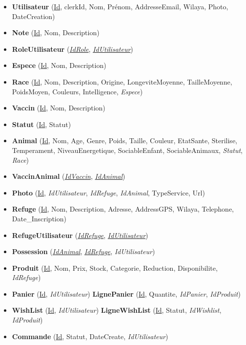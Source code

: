 \documentclass[12pt,a4paper]{report}
\begin{document}
{\small
\begin{itemize}[leftmargin=1.5em,itemsep=2pt]
  \item \textbf{Utilisateur} (\underline{Id}, clerkId, Nom, Prénom, AddresseEmail, Wilaya, Photo, DateCreation)
  \item \textbf{Note} (\underline{Id}, Nom, Description)
  \item \textbf{RoleUtilisateur} (\underline{\textit{IdRole}}, \underline{\textit{IdUtilisateur}})
  \item \textbf{Espece} (\underline{Id}, Nom, Description)
  \item \textbf{Race} (\underline{Id}, Nom, Description, Origine, LongeviteMoyenne, TailleMoyenne, PoidsMoyen, Couleurs, Intelligence, \textit{Espece})
  \item \textbf{Vaccin} (\underline{Id}, Nom, Description)
  \item \textbf{Statut} (\underline{Id}, Statut)
  \item \textbf{Animal} (\underline{Id}, Nom, Age, Genre, Poids, Taille, Couleur, EtatSante, Sterilise, Temperament, NiveauEnergetique, SociableEnfant, SociableAnimaux, \textit{Statut}, \textit{Race})
  \item \textbf{VaccinAnimal} (\underline{\textit{IdVaccin}}, \underline{\textit{IdAnimal}})
  \item \textbf{Photo} (\underline{Id}, \textit{IdUtilisateur}, \textit{IdRefuge}, \textit{IdAnimal}, TypeService, Url)
  \item \textbf{Refuge} (\underline{Id}, Nom, Description, Adresse, AddressGPS, Wilaya, Telephone, Date\_Inscription)
  \item \textbf{RefugeUtilisateur} (\underline{\textit{IdRefuge}}, \underline{\textit{IdUtilisateur}})
  \item \textbf{Possession} (\underline{\textit{IdAnimal}}, \underline{\textit{IdRefuge}}, \textit{IdUtilisateur})
  \item \textbf{Produit} (\underline{Id}, Nom, Prix, Stock, Categorie, Reduction, Disponibilite, \textit{IdRefuge})
  \item \textbf{Panier} (\underline{Id}, \textit{IdUtilisateur}) \quad \textbf{LignePanier} (\underline{Id}, Quantite, \textit{IdPanier}, \textit{IdProduit})
  \item \textbf{WishList} (\underline{Id}, \textit{IdUtilisateur}) \quad \textbf{LigneWishList} (\underline{Id}, Statut, \textit{IdWishlist}, \textit{IdProduit})
  \item \textbf{Commande} (\underline{Id}, Statut, DateCreate, \textit{IdUtilisateur})

\end{itemize}}
\end{document}
